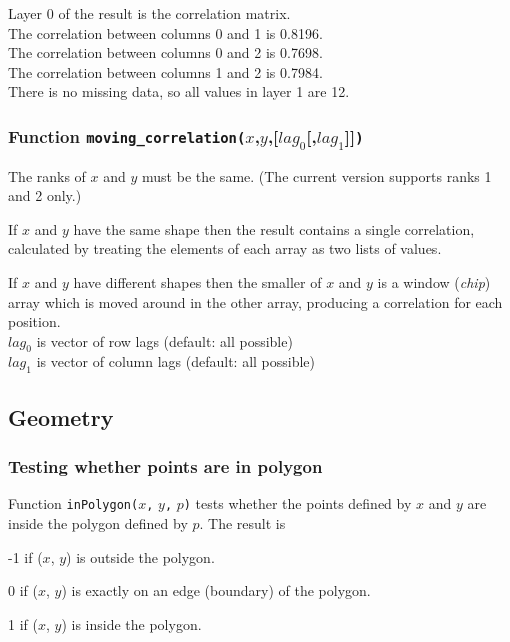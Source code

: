 Layer 0 of the result is the correlation matrix.
  \\The correlation between columns 0 and 1 is 0.8196.
  \\The correlation between columns 0 and 2 is 0.7698.
  \\The correlation between columns 1 and 2 is 0.7984.
  \\There is no missing data, so all values in layer 1 are 12.

\subsubsection{Function \texttt{moving\_correlation(}$x$,$y$,[$lag_0$[,$lag_1$]]\texttt{)}}
    \label{function-moving-correlation}

The ranks of $x$ and $y$ must be the same.
(The current version supports ranks 1 and 2 only.)

If $x$ and $y$ have the same shape then the result contains a single
correlation, calculated by treating the elements of each array as two lists of values.

If $x$ and $y$ have different shapes then the smaller of $x$ and 
$y$ is a window (\textit{chip}) array which is moved around in the other array,
producing a correlation for each position.
\\
$lag_0$ is vector of row lags (default: all possible)
\\
$lag_1$ is vector of column lags (default: all possible)

\subsection{Geometry}
    \label{function-Geometry}

\subsubsection{Testing whether points are in polygon}
    \label{function-inPolygon}

  \par Function 
  \texttt{inPolygon(}$x$\texttt{,} $y$\texttt{,} $p$\texttt{)} 
  tests whether the points defined by 
  $x$ and 
  $y$ are inside the polygon defined by 
  $p$. The result is
\begin{bullets}
    \item -1 if ($x$, $y$) is outside the polygon.
    \item 0 if ($x$, $y$) is exactly on an edge (boundary) of the polygon.
    \item 1 if ($x$, $y$) is inside the polygon.
\end{bullets}

